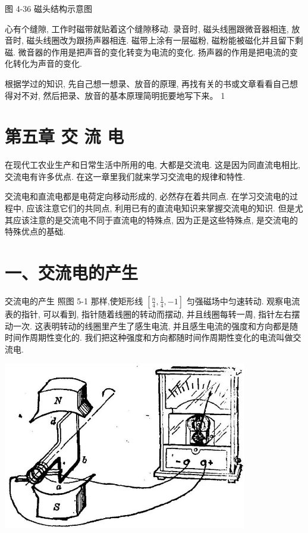 \documentclass[10pt]{article}
\begin{document}
图 4-36 磁头结构示意图

心有个缝隙, 工作时磁带就贴着这个缝隙移动. 录音时, 磁头线圈跟微音器相连, 放音时, 磁头线圈改为跟扬声器相连. 磁带上涂有一层磁粉, 磁粉能被磁化并且留下剩磁. 微音器的作用是把声音的变化转变为电流的变化. 扬声器的作用是把电流的变化转化为声音的变化.

根据学过的知识, 先自己想一想录、放音的原理, 再找有关的书或文章看看自己想得对不对, 然后把录、放音的基本原理简明扼要地写下来。 1

\section*{第五章 交 流 电}

在现代工农业生产和日常生活中所用的电, 大都是交流电. 这是因为同直流电相比, 交流电有许多优点. 在这一章里我们就来学习交流电的规律和特性.

交流电和直流电都是电荷定向移动形成的, 必然存在着共同点. 在学习交流电的过程中, 应该注意它们的共同点, 利用已有的直流电知识来掌握交流电的知识. 但是尤其应该注意的是交流电不同于直流电的特殊点, 因为正是这些特殊点, 是交流电的特殊优点的基础.

\section*{一、交流电的产生}

交流电的产生 照图 5-1 那样,使矩形线 \(\left\lbrack {\frac{n}{4},\frac{1}{4}, - 1}\right\rbrack\) 匀强磁场中匀速转动. 观察电流表的指针, 可以看到, 指针随着线圈的转动而摆动, 并且线圈每转一周, 指针左右摆动一次. 这表明转动的线圈里产生了感生电流, 并且感生电流的强度和方向都是随时间作周期性变化的. 我们把这种强度和方向都随时间作周期性变化的电流叫做交流电.

\begin{center}
\includegraphics[max width=0.8\textwidth]{images/01913056-1f15-74d8-9184-9aab52c9d66b_159_492476.jpg}
\end{center}
\end{document}
